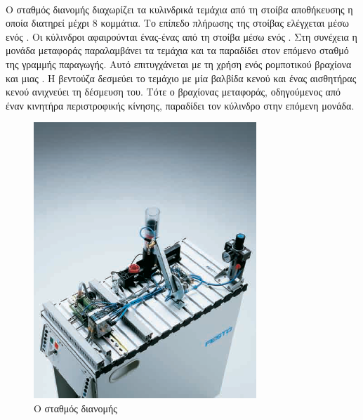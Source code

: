 \documentclass[a4paper,12pt,twoside]{report}
\begin{document}
				\paragraph{} {Ο σταθμός διανομής διαχωρίζει τα κυλινδρικά τεμάχια από τη στοίβα αποθήκευσης η οποία διατηρεί μέχρι 8 κομμάτια. Το επίπεδο πλήρωσης της στοίβας ελέγχεται μέσω ενός . Οι κύλινδροι αφαιρούνται ένας-ένας από τη στοίβα μέσω ενός . Στη συνέχεια η \gls{μονάδα μεταφοράς} παραλαμβάνει τα τεμάχια και τα παραδίδει στον επόμενο σταθμό της γραμμής παραγωγής. Αυτό επιτυγχάνεται με τη χρήση ενός ρομποτικού βραχίονα και μιας . Η βεντούζα δεσμεύει το τεμάχιο με μία βαλβίδα κενού και ένας \gls{αισθητήρας κενού} ανιχνεύει τη δέσμευση του. Τότε ο βραχίονας μεταφοράς, οδηγούμενος από έναν κινητήρα περιστροφικής κίνησης, παραδίδει τον κύλινδρο στην επόμενη μονάδα.
				}
				
				\begin{figure}[hp]
					\centering
					\includegraphics[scale=0.25]{DistributionStationFesto.png}
					\caption{Ο σταθμός διανομής \cite{OverviewMPSStations}}
					\label{φωτ:Ο σταθμός διανομής από Festo}
				\end{figure}
				
\end{document}
